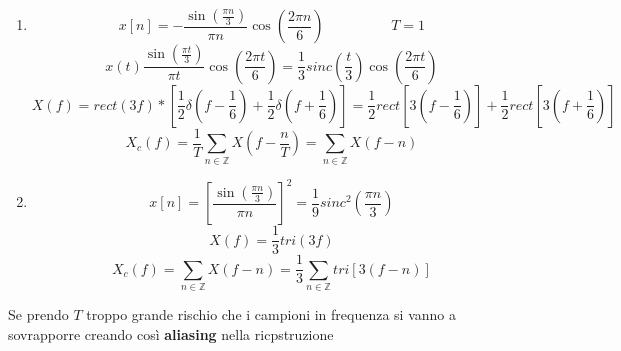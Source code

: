 \documentclass{article}
\begin{document}
\begin{enumerate}
    \item \[x[n]=-\frac{\sin\left(\frac{\pi n}{3}\right)}{\pi n}\cos\left(\frac{2\pi n}{6}\right)\hspace{2cm}T=1\]
        \[x(t)\frac{\sin\left(\frac{\pi t}{3}\right)}{\pi t}\cos\left(\frac{2\pi t}{6}\right)=\frac{1}{3}sinc\left(\frac{t}{3}\right)\cos\left(\frac{2\pi t}{6}\right)\]
        \[X(f)=rect(3f)*\left[\frac{1}{2}\delta\left(f-\frac{1}{6}\right)+\frac{1}{2}\delta\left(f+\frac{1}{6}\right)\right]=\frac{1}{2}rect\left[3\left(f-\frac{1}{6}\right)\right]+\frac{1}{2}rect\left[3\left(f+\frac{1}{6}\right)\right]\]
        \[X_c(f)=\frac{1}{T}\sum_{n\in\mathbb{Z}}X\left(f-\frac{n}{T}\right)=\sum_{n\in\mathbb{Z}}X(f-n)\]
    \item \[x[n]={\left[\frac{\sin\left(\frac{\pi n}{3}\right)}{\pi n}\right]}^2=\frac{1}{9}{sinc}^2\left(\frac{\pi n}{3}\right)\]
        \[X(f)=\frac{1}{3}tri(3f)\]
        \[X_c(f)=\sum_{n\in\mathbb{Z}}X(f-n)=\frac{1}{3}\sum_{n\in\mathbb{Z}}tri[3(f-n)]\]
\end{enumerate}

Se prendo \(T\) troppo grande rischio che i campioni in frequenza si vanno a sovrapporre creando così \textbf{aliasing} nella ricpstruzione
\end{document}
